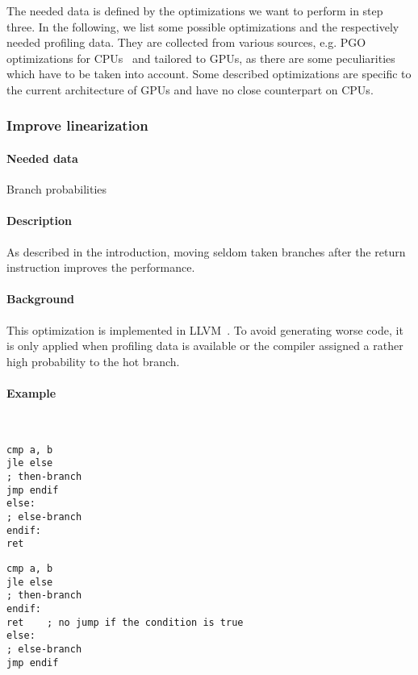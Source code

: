 The needed data is defined by the optimizations we want to perform in step three. In the following, we list some possible optimizations and the respectively needed profiling data. They are collected from various sources, e.g. PGO optimizations for CPUs~\cite{MicrosoftPgo} and tailored to GPUs, as there are some peculiarities which have to be taken into account. Some described optimizations are specific to the current architecture of GPUs and have no close counterpart on CPUs.

\subsubsection{Improve linearization}
\paragraph{Needed data} Branch probabilities
\paragraph{Description} As described in the introduction, moving seldom taken branches after the return instruction improves the performance.
\paragraph{Background} This optimization is implemented in LLVM~\cite{llvmLinearization}. To avoid generating worse code, it is only applied when profiling data is available or the compiler assigned a rather high probability to the hot branch.
\paragraph{Example}\ \\%
\begin{minipage}{.47\textwidth}
\begin{lstlisting}[caption={Linearization -- unoptimized},frame=tlrb,language={[x86masm]Assembler}]
cmp a, b
jle else
; then-branch
jmp endif
else:
; else-branch
endif:
ret
\end{lstlisting}
\end{minipage}\hfill
\begin{minipage}{.47\textwidth}
\begin{lstlisting}[caption={Linearization -- optimized},frame=tlrb,language={[x86masm]Assembler}]
cmp a, b
jle else
; then-branch
endif:
ret    ; no jump if the condition is true
else:
; else-branch
jmp endif
\end{lstlisting}
\end{minipage}

